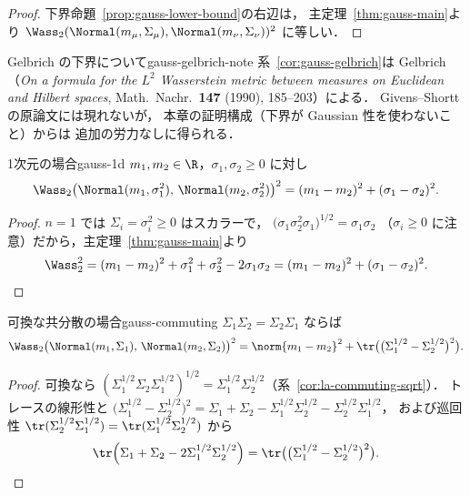 \begin{proof}
  下界命題~\ref{prop:gauss-lower-bound}の右辺は，
  主定理~\ref{thm:gauss-main}より
  $\Wass_2(\Normal(m_\mu,\Sigma_\mu),\Normal(m_\nu,\Sigma_\nu))^2$
  に等しい．
\end{proof}

\begin{remark}{Gelbrich の下界について}{gauss-gelbrich-note}
  系~\ref{cor:gauss-gelbrich}は Gelbrich
  （\emph{On a formula for the $L^2$ Wasserstein metric between measures on Euclidean and Hilbert spaces},
  Math.\ Nachr.\ \textbf{147} (1990), 185--203）による．
  Givens--Shortt の原論文には現れないが，
  本章の証明構成（下界が Gaussian 性を使わないこと）からは
  追加の労力なしに得られる．
\end{remark}

\begin{corollary}{1次元の場合}{gauss-1d}
  $m_1,m_2\in\R$，$\sigma_1,\sigma_2\geq0$ に対し
  \[
    \Wass_2\bigl(\Normal(m_1,\sigma_1^2),\,\Normal(m_2,\sigma_2^2)\bigr)^2
    =(m_1-m_2)^2+(\sigma_1-\sigma_2)^2.
  \]
\end{corollary}

\begin{proof}
  $n=1$ では $\Sigma_i=\sigma_i^2\geq0$ はスカラーで，
  $\bigl(\sigma_1\sigma_2^2\sigma_1\bigr)^{1/2}=\sigma_1\sigma_2$
  （$\sigma_i\geq0$ に注意）だから，主定理~\ref{thm:gauss-main}より
  \[
    \Wass_2^2
    =(m_1-m_2)^2+\sigma_1^2+\sigma_2^2-2\sigma_1\sigma_2
    =(m_1-m_2)^2+(\sigma_1-\sigma_2)^2.  \qedhere
  \]
\end{proof}

\begin{corollary}{可換な共分散の場合}{gauss-commuting}
  $\Sigma_1\Sigma_2=\Sigma_2\Sigma_1$ ならば
  \[
    \Wass_2\bigl(\Normal(m_1,\Sigma_1),\,\Normal(m_2,\Sigma_2)\bigr)^2
    =\norm{m_1-m_2}^2
    +\tr\bigl(\bigl(\Sigma_1^{1/2}-\Sigma_2^{1/2}\bigr)^2\bigr).
  \]
\end{corollary}

\begin{proof}
  可換なら $(\Sigma_1^{1/2}\Sigma_2\Sigma_1^{1/2})^{1/2}
  =\Sigma_1^{1/2}\Sigma_2^{1/2}$（系~\ref{cor:la-commuting-sqrt}）．
  トレースの線形性と
  $\bigl(\Sigma_1^{1/2}-\Sigma_2^{1/2}\bigr)^2
  =\Sigma_1+\Sigma_2-\Sigma_1^{1/2}\Sigma_2^{1/2}-\Sigma_2^{1/2}\Sigma_1^{1/2}$，
  および巡回性
  $\tr(\Sigma_2^{1/2}\Sigma_1^{1/2})=\tr(\Sigma_1^{1/2}\Sigma_2^{1/2})$ から
  \[
    \tr\Bigl(\Sigma_1+\Sigma_2-2\Sigma_1^{1/2}\Sigma_2^{1/2}\Bigr)
    =\tr\bigl(\bigl(\Sigma_1^{1/2}-\Sigma_2^{1/2}\bigr)^2\bigr).  \qedhere
  \]
\end{proof}

